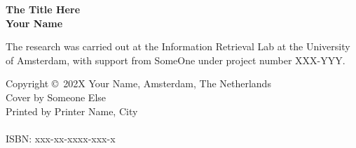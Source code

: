 
{\pagestyle{empty}
\newcommand{\printtitle}{%
{\Huge\bf The Title Here \\[0.8cm]
}}

\begin{titlepage}
\par\vskip 2cm
\begin{center}
\printtitle
\vfill
{\LARGE\bf Your Name}
\vskip 2cm
\end{center}
\end{titlepage}



\mbox{}
\vfill

\noindent
The research was carried out at the Information Retrieval Lab at the University of Amsterdam, with support from SomeOne under project number XXX-YYY.  \\
\bigskip

\noindent
Copyright \copyright~202X Your Name, Amsterdam, The Netherlands\\
Cover by Someone Else\\
Printed by Printer Name, City\\
\\
ISBN: xxx-xx-xxxx-xxx-x\\

\clearpage

\setcounter{page}{1}


}
